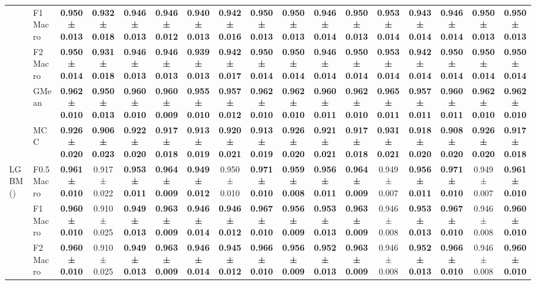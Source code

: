 \begin{table}[H]
{\begin{tabular}{llccccccccccccccc}
 & F1 Macro & \textbf{0.950 ± 0.013} & \textbf{0.932 ± 0.018} & \textbf{0.946 ± 0.013} & \textbf{0.946 ± 0.012} & \textbf{0.940 ± 0.013} & \textbf{0.942 ± 0.016} & \textbf{0.950 ± 0.013} & \textbf{0.950 ± 0.013} & \textbf{0.946 ± 0.014} & \textbf{0.950 ± 0.013} & \textbf{0.953 ± 0.014} & \textbf{0.943 ± 0.014} & \textbf{0.946 ± 0.014} & \textbf{0.950 ± 0.013} & \textbf{0.950 ± 0.013} \\
 & F2 Macro & \textbf{0.950 ± 0.014} & \textbf{0.931 ± 0.018} & \textbf{0.946 ± 0.013} & \textbf{0.946 ± 0.013} & \textbf{0.939 ± 0.013} & \textbf{0.942 ± 0.017} & \textbf{0.950 ± 0.014} & \textbf{0.950 ± 0.014} & \textbf{0.946 ± 0.014} & \textbf{0.950 ± 0.014} & \textbf{0.953 ± 0.014} & \textbf{0.942 ± 0.014} & \textbf{0.950 ± 0.014} & \textbf{0.950 ± 0.014} & \textbf{0.950 ± 0.014} \\
 & GMean & \textbf{0.962 ± 0.010} & \textbf{0.950 ± 0.013} & \textbf{0.960 ± 0.010} & \textbf{0.960 ± 0.009} & \textbf{0.955 ± 0.010} & \textbf{0.957 ± 0.012} & \textbf{0.962 ± 0.010} & \textbf{0.962 ± 0.010} & \textbf{0.960 ± 0.011} & \textbf{0.962 ± 0.010} & \textbf{0.965 ± 0.011} & \textbf{0.957 ± 0.011} & \textbf{0.960 ± 0.011} & \textbf{0.962 ± 0.010} & \textbf{0.962 ± 0.010} \\
 & MCC & \textbf{0.926 ± 0.020} & \textbf{0.906 ± 0.023} & \textbf{0.922 ± 0.020} & \textbf{0.917 ± 0.018} & \textbf{0.913 ± 0.019} & \textbf{0.920 ± 0.021} & \textbf{0.913 ± 0.019} & \textbf{0.926 ± 0.020} & \textbf{0.921 ± 0.021} & \textbf{0.917 ± 0.018} & \textbf{0.931 ± 0.021} & \textbf{0.918 ± 0.020} & \textbf{0.908 ± 0.020} & \textbf{0.926 ± 0.020} & \textbf{0.917 ± 0.018} \\
\cline{1-17}
\multirow[t]{5}{*}{LGBM()} & F0.5 Macro & \textbf{0.961 ± 0.010} & 0.917 ± 0.022 & \textbf{0.953 ± 0.011} & \textbf{0.964 ± 0.009} & \textbf{0.949 ± 0.012} & 0.950 ± 0.010 & \textbf{0.971 ± 0.010} & \textbf{0.959 ± 0.008} & \textbf{0.956 ± 0.011} & \textbf{0.964 ± 0.009} & 0.949 ± 0.007 & \textbf{0.956 ± 0.011} & \textbf{0.971 ± 0.010} & 0.949 ± 0.007 & \textbf{0.961 ± 0.010} \\
 & F1 Macro & \textbf{0.960 ± 0.010} & 0.910 ± 0.025 & \textbf{0.949 ± 0.013} & \textbf{0.963 ± 0.009} & \textbf{0.946 ± 0.014} & \textbf{0.946 ± 0.012} & \textbf{0.967 ± 0.010} & \textbf{0.956 ± 0.009} & \textbf{0.953 ± 0.013} & \textbf{0.963 ± 0.009} & 0.946 ± 0.008 & \textbf{0.953 ± 0.013} & \textbf{0.967 ± 0.010} & 0.946 ± 0.008 & \textbf{0.960 ± 0.010} \\
 & F2 Macro & \textbf{0.960 ± 0.010} & 0.910 ± 0.025 & \textbf{0.949 ± 0.013} & \textbf{0.963 ± 0.009} & \textbf{0.946 ± 0.014} & \textbf{0.945 ± 0.012} & \textbf{0.966 ± 0.010} & \textbf{0.956 ± 0.009} & \textbf{0.952 ± 0.013} & \textbf{0.963 ± 0.009} & 0.946 ± 0.008 & \textbf{0.952 ± 0.013} & \textbf{0.966 ± 0.010} & 0.946 ± 0.008 & \textbf{0.960 ± 0.010} \\

\end{tabular}}
\end{table}
